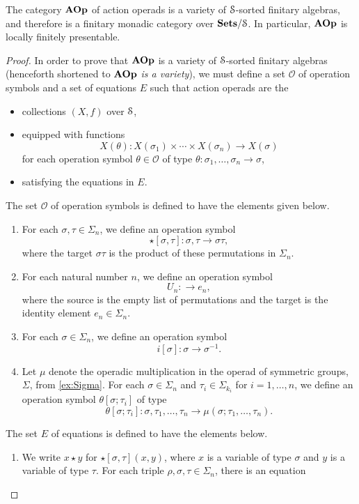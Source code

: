 \begin{thm}\label{thm:aop-lfp}
The category $\mathbf{AOp}$ of action operads is a variety of $\mathcal{S}$-sorted finitary algebras, and therefore is a finitary monadic category over $\mathbf{Sets}/\mathcal{S}$. In particular, $\mathbf{AOp}$ is locally finitely presentable.
\end{thm}
\begin{proof}
In order to prove that $\mathbf{AOp}$ is a variety of $\mathcal{S}$-sorted finitary algebras (henceforth shortened to \emph{$\mathbf{AOp}$ is a variety}), we must define a set $\mathcal{O}$ of operation symbols and a set of equations $E$ such that action operads are the 
\begin{itemize}
\item collections $(X, f)$ over $\mathcal{S}$, 
\item equipped with functions
\[
X(\theta) \colon X(\sigma_1) \times \cdots \times X(\sigma_n) \to X(\sigma)
\]
for each operation symbol $\theta \in \mathcal{O}$ of type $\theta \colon \sigma_1, \ldots, \sigma_n \to \sigma$,
\item satisfying the equations in $E$.
\end{itemize}
The set $\mathcal{O}$ of operation symbols is defined to have the elements given below.
\begin{enumerate}
\item For each $\sigma, \tau \in \Sigma_n$, we define an operation symbol
\[
\star[\sigma, \tau] \colon \sigma, \tau \to \sigma \tau,
\]
where the target $\sigma \tau$ is the product of these permutations in $\Sigma_n$.
\item For each natural number $n$, we define an operation symbol
\[
U_n \colon \to e_n,
\]
where the source is the empty list of permutations and the target is the identity element $e_n \in \Sigma_n$.
\item For each $\sigma \in \Sigma_n$, we define an operation symbol
\[
i[\sigma] \colon \sigma \to \sigma^{-1}.
\]
\item Let $\mu$ denote the operadic multiplication in the operad of symmetric groups, $\Sigma$, from \cref{ex:Sigma}. For each $\sigma \in \Sigma_n$ and $\tau_i \in \Sigma_{k_i}$ for $i=1, \ldots, n$, we define an operation symbol $\theta[\sigma; \tau_i]$ of type
\[
\theta[\sigma; \tau_i] \colon \sigma, \tau_1, \ldots, \tau_n \to \mu(\sigma; \tau_1, \ldots, \tau_n).
\]
\end{enumerate}
The set $E$ of equations is defined to have the elements below.
\begin{enumerate}
\item We write $x \star y$ for $\star[\sigma, \tau](x,y)$, where $x$ is a variable of type $\sigma$ and $y$ is a variable of type $\tau$. For each triple $\rho, \sigma, \tau \in \Sigma_n$, there is an equation

\end{enumerate}
\end{proof}
